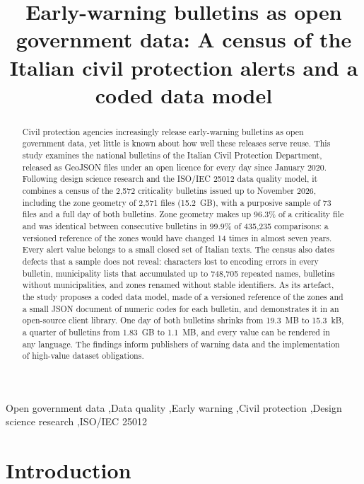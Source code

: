 \documentclass[review,authoryear,12pt]{elsarticle}
\begin{document}
\begin{frontmatter}

\title{Early-warning bulletins as open government data: A census of the
Italian civil protection alerts and a coded data model}

\begin{abstract}
Civil protection agencies increasingly release early-warning bulletins as
open government data, yet little is known about how well these releases serve
reuse. This study examines the national bulletins of the Italian Civil
Protection Department, released as GeoJSON files under an open licence for
every day since January 2020. Following design science research and the
ISO/IEC 25012 data quality model, it combines a census of the 2,572
criticality bulletins issued up to November 2026, including the zone
geometry of 2,571 files (15.2~GB), with a purposive sample of 73 files and a
full day of both bulletins. Zone geometry makes up 96.3\% of a criticality
file and was identical between consecutive bulletins in 99.9\% of 435,235
comparisons: a versioned reference of the zones would have changed 14 times in
almost seven years. Every alert value belongs to a small closed set of Italian
texts. The census also dates defects that a sample does not reveal:
characters lost to encoding errors in every bulletin, municipality lists that
accumulated up to 748,705 repeated names, bulletins without municipalities,
and zones renamed without stable identifiers. As its artefact, the study
proposes a coded data model, made of a versioned reference of the zones and
a small JSON document of numeric codes for each bulletin, and demonstrates it
in an open-source client library. One day of both bulletins shrinks from
19.3~MB to 15.3~kB, a quarter of bulletins from 1.83~GB to 1.1~MB, and every
value can be rendered in any language. The findings inform
publishers of warning data and the implementation of high-value dataset
obligations.
\end{abstract}

\begin{keyword}
Open government data \sep Data quality \sep Early warning \sep Civil
protection \sep Design science research \sep ISO/IEC 25012
\end{keyword}

\end{frontmatter}

\section{Introduction}
\label{sec:introduction}
\end{document}
